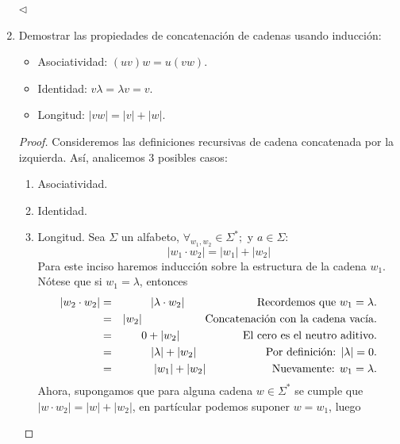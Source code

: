 \documentclass{article}
\begin{document}
\begin{enumerate}
  \hfill $\lhd$
\item Demostrar las propiedades de concatenación de cadenas usando inducción:
  \newcommand{\localtextbulletone}{\textcolor{gray}{\raisebox{.45ex}{\rule{.6ex}{.6ex}}}}
  \renewcommand{\labelitemi}{\localtextbulletone}
  \begin{itemize}
  \item Asociatividad: $(uv)w = u(vw)$.
  \item Identidad: $v\lambda = \lambda v = v$.
  \item Longitud: $|vw| = |v| + |w|$.
  \end{itemize}
  \renewcommand\qedsymbol{QED}
  \begin{proof} Consideremos las definiciones recursivas de cadena
    concatenada por la izquierda. Así, analicemos 3 posibles casos:
    \begin{enumerate}
    \item Asociatividad.
    \item Identidad.
    \item Longitud.
      Sea $\Sigma$ un alfabeto, $\forall_{w_1, w_2} \in \Sigma^{*};$ y $a \in \Sigma:$
      \[
      |w_1 \cdot w_2| = |w_1| + |w_2|
      \]
      Para este inciso haremos inducción sobre la estructura de la
      cadena $w_1$. Nótese que si $w_{1} = \lambda$, entonces
      \begin{eqnarray*}
        |w_{2} \cdot w_{2}| &=& |\lambda \cdot w_{2}|
        \hspace*{2.3cm} \text{Recordemos que }  w_{1} = \lambda.\\
        &=& |w_{2}|
        \hspace*{2cm} \text{Concatenación con la cadena vac\'ia.}\\
        &=& 0 + |w_{2}|
        \hspace*{2cm} \text{El cero es el neutro aditivo.}\\
        &=& |\lambda| + |w_{2}|
        \hspace*{2.2cm} \text{Por definición: } |\lambda| = 0.\\
        &=& |w_{1}| + |w_{2}|
        \hspace*{2.1cm} \text{Nuevamente: } w_{1} = \lambda.
      \end{eqnarray*}
      Ahora, supongamos que para alguna cadena $w \in \Sigma^{*}$
      se cumple que $|w \cdot w_{2}| = |w| + |w_{2}|$, en partícular
      podemos suponer $w = w_{1}$, luego

\end{enumerate}
\end{proof}
\end{enumerate}
\end{document}
